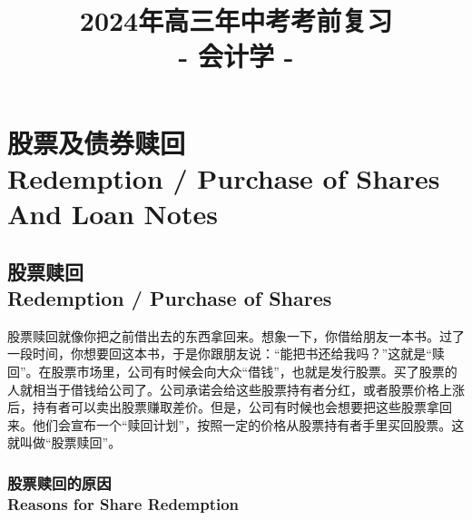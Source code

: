 \documentclass{article}
\title{\Large{2024年高三年中考考前复习}\\\LARGE{\textbf{- 会计学 -}}}
\date{}
\begin{document}
\maketitle

\vspace*{-4em}
\section{股票及债券赎回\\Redemption / Purchase of Shares And Loan Notes}

\subsection{股票赎回\\Redemption / Purchase of Shares}

\noindent 股票赎回就像你把之前借出去的东西拿回来。想象一下，你借给朋友一本书。过了一段时间，你想要回这本书，于是你跟朋友说：“能把书还给我吗？”这就是“赎回”。在股票市场里，公司有时候会向大众“借钱”，也就是发行股票。买了股票的人就相当于借钱给公司了。公司承诺会给这些股票持有者分红，或者股票价格上涨后，持有者可以卖出股票赚取差价。但是，公司有时候也会想要把这些股票拿回来。他们会宣布一个“赎回计划”，按照一定的价格从股票持有者手里买回股票。这就叫做“股票赎回”。

\subsubsection{股票赎回的原因\\Reasons for Share Redemption}
\end{document}
